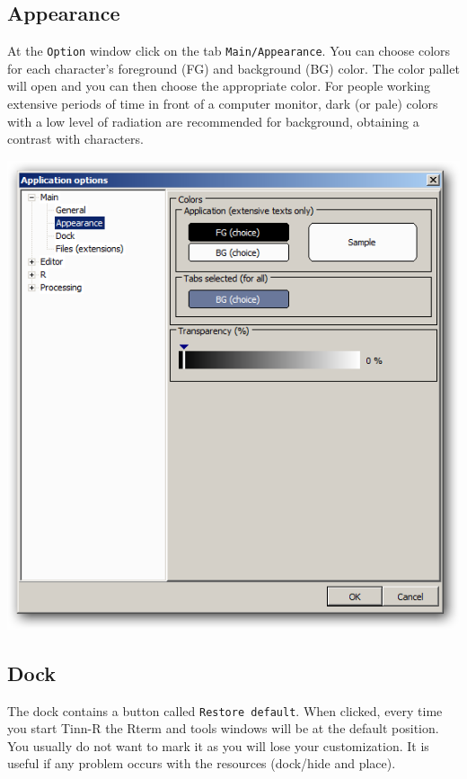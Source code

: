 \subsection{Appearance}

At the \texttt{Option} window click on the tab \texttt{Main/Appearance}.
You can choose colors for each character's foreground (FG) and background (BG) color.
The color pallet will open and you can then choose the appropriate color.
For people working extensive periods of time in front of a computer monitor,
dark (or pale) colors with a low level of radiation are recommended for background,
obtaining a contrast with characters.

\includegraphics[scale=0.50]{./res/app_main_appearance.png}

\subsection{Dock}

The dock contains a button called \texttt{Restore default}.
When clicked, every time you start Tinn-R the Rterm and tools windows will be at the default position.
You usually do not want to mark it as you will lose your customization.
It is useful if any problem occurs with the resources (dock/hide and place).

